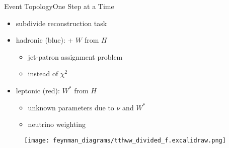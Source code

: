 \documentclass[9pt, aspectratio=169]{beamer}
\begin{document}
\begin{frame}{Event Topology}{One Step at a Time}
	\begin{minipage}{.58\textwidth}
		\begin{itemize}
			\item subdivide reconstruction task
			\item hadronic (blue): \ttbar + $W$ from $H$
			\begin{itemize}
				\item jet-patron assignment problem
				\item \spanet instead of $\chi^2$
			\end{itemize}
			\item leptonic (red): $W^*$ from $H$ 
			\begin{itemize}
				\item unknown parameters due to $\nu$ and $W^*$ 
				\item neutrino weighting
			\end{itemize}
		\end{itemize}
	\end{minipage}
	\begin{minipage}{.4\textwidth}
		\begin{figure}
			\centering
			\texttt{[image: feynman\_diagrams/tthww\_divided\_f.excalidraw.png]}
		\end{figure}
	\end{minipage}
\end{frame}
\end{document}
